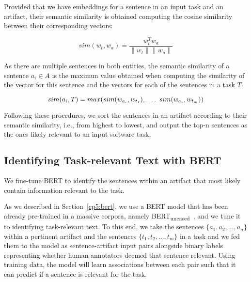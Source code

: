  
 Provided that we have embeddings for a sentence in an input task and an artifact, their semantic similarity is obtained computing the cosine similarity  between their corresponding vectors:


\begin{equation}
    sim(w_t,w_a) = \frac{w_t^Tw_a}{\|w_t\| \|w_a\|}
    \label{eq:word-sim}
\end{equation}
 
\smallskip
 As there are multiple sentences in both entities, the semantic similarity of a sentence $a_i \in A$ is the maximun value obtained when computing the similarity of the vector for this sentence and the vectors for each of the sentences in a task $T$.

 \begin{equation}
    sim(a_i, T) = max(sim(w_{a_i}, w_{t_1}), ~\dots~ sim(w_{a_i}, w_{t_m})) \\
\end{equation}


Following these procedures, we sort the sentences in an artifact according to their semantic similarity, i.e., from highest to lowest, and output the top-n sentences as the ones likely relevant to an input software task.


\subsection{Identifying Task-relevant Text with BERT}




We fine-tune BERT to identify the sentences within an artifact that most likely contain information relevant to the task.



As we described in Section~\ref{cp5:bert}, we use a BERT model that has been already pre-trained in a massive corpora, namely BERT\textsubscript{uncased}~\cite{Devlin2018Bert}, and we tune it to  identifying task-relevant text.
To this end, we take the sentences $\{a_1, a_2, \dots, a_n\}$ within a pertinent artifact and the sentences $\{t_1, t_2, \dots, t_m\}$ in a task and we fed them to the model as sentence-artifact input pairs 
alongside binary labels representing whether human annotators deemed that sentence relevant. 
Using training data, the model will learn associations between each pair such that it can predict if a sentence is relevant for the task. 


